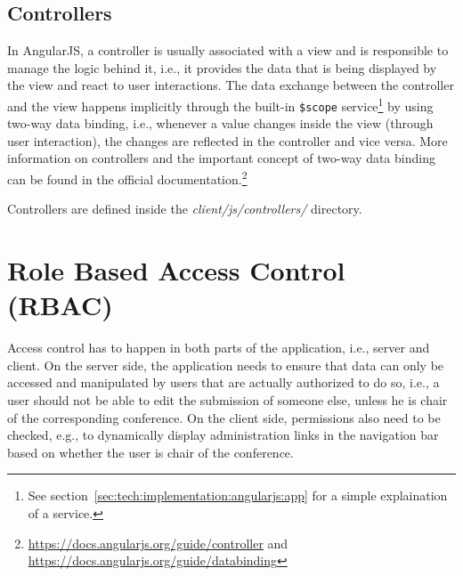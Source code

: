 \documentclass[nochapterpage,nopartpage,noheadingspace,numbersubsubsec,bigchapter,colorback,accentcolor=tud9c,10pt]{tudreport}
\begin{document}
  \subsection{Controllers}
  \label{sec:tech:implementation:angularjs:controllers}

    In AngularJS, a controller is usually associated with a view and is responsible to manage the logic behind it, i.e., it provides the data that is being displayed by the view and react to user interactions. The data exchange between the controller and the view happens implicitly through the built-in \texttt{\$scope} service\footnote{See section~\ref{sec:tech:implementation:angularjs:app} for a simple explaination of a service.} by using two-way data binding, i.e., whenever a value changes inside the view (through user interaction), the changes are reflected in the controller and vice versa. More information on controllers and the important concept of two-way data binding can be found in the official documentation.\footnote{\url{https://docs.angularjs.org/guide/controller} and \url{https://docs.angularjs.org/guide/databinding}}

    Controllers are defined inside the \emph{client/js/controllers/} directory.



  \section{Role Based Access Control (RBAC)}
  \label{sec:tech:implementation:rbac}

    Access control has to happen in both parts of the application, i.e., server and client. On the server side, the application needs to ensure that data can only be accessed and manipulated by users that are actually authorized to do so, i.e., a user should not be able to edit the submission of someone else, unless he is chair of the corresponding conference. On the client side, permissions also need to be checked, e.g., to dynamically display administration links in the navigation bar based on whether the user is chair of the conference.
\end{document}
